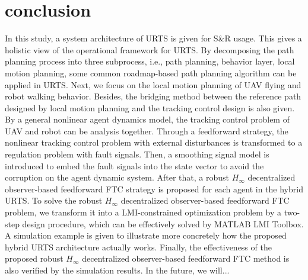 \documentclass{ieeeaccess}
\begin{document}
\section{conclusion}
In this study, a system architecture of URTS is given for S\&R usage. This gives a holistic view of the operational framework for URTS. By decomposing the path planning process into three subprocess, i.e., path planning, behavior layer, local motion planning, some common roadmap-based path planning algorithm can be applied in URTS. Next, we focus on the local motion planning of UAV flying and robot walking behavior. Besides, the bridging method between the reference path designed by local motion planning and the tracking control design is also given. By a general nonlinear agent dynamics model, the tracking control problem of UAV and robot can be analysis together. Through a feedforward strategy, the nonlinear tracking control problem with external disturbances is transformed to a regulation problem with fault signals. Then, a smoothing signal model is introduced to embed the fault signals into the state vector to avoid the corruption on the agent dynamic system. After that, a robust $H_\infty$ decentralized observer-based feedforward FTC strategy is proposed for each agent in the hybrid URTS. To solve the robust $H_\infty$ decentralized observer-based feedforward FTC problem, we transform it into a LMI-constrained optimization problem by a two-step design procedure, which can be effectively solved by MATLAB LMI Toolbox. A simulation example is given to illustrate more concretely how the proposed hybrid URTS architecture actually works. Finally, the effectiveness of the proposed robust $H_\infty$ decentralized observer-based feedforward FTC method is also verified by the simulation results. In the future, we will...




\EOD
\end{document}

